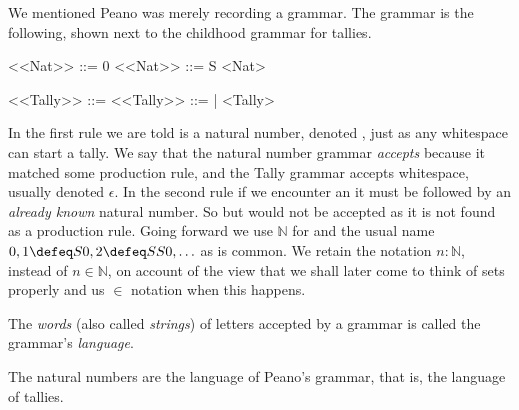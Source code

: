 \index{\code{::=}}
We mentioned Peano was merely recording a grammar.  
The grammar is the following, shown next to the childhood grammar for tallies.
\begin{center}
\begin{minipage}{0.4\textwidth}
\begin{Gcode}[]
<<Nat>> ::= 0 
<<Nat>> ::= S <Nat>
\end{Gcode}
\end{minipage}
\hfill
\begin{minipage}{0.45\textwidth}
\begin{Gcode}[]
<<Tally>> ::=  
<<Tally>> ::= | <Tally>
\end{Gcode}
\end{minipage}
\end{center}
In the first rule we are told  is a natural number, denoted
, just as any whitespace can start a tally. We say that the natural
number grammar \emph{accepts}  because it matched some production rule,
and the Tally grammar accepts whitespace, usually denoted $\epsilon$.  In the
second rule if we encounter an  it must be followed by an \emph{already
known} natural number.  So  but  would not be accepted as
it is not found as a production rule.  Going forward we use $\mathbb{N}$ 
for  and the usual name $0,1\defeq S0, 2\defeq SS0,\ldots$ as is common.
We retain the notation $n:\mathbb{N}$, instead of $n\in \mathbb{N}$, on account 
of the view that we shall later come to think of sets properly and us $\in$ notation 
when this happens.

\begin{definition}
    The \emph{words} (also called \emph{strings}) of letters accepted by a grammar is called
    the grammar's \emph{language}.
\end{definition}

\begin{example}
The natural numbers are the language of Peano's grammar, that is, the language of tallies.
\end{example}


